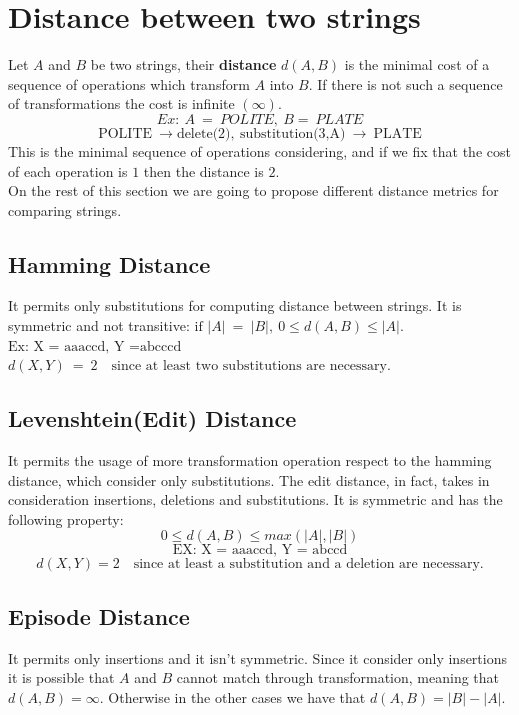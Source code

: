\section{Distance between two strings}
Let $A$ and $B$ be two strings, their \textbf{distance} $d(A,B)$ is the minimal cost of a sequence of operations which transform $A$ into $B$. If there is not such a sequence of transformations the cost is infinite $(\infty)$.
$$Ex:~A~=~POLITE,~B=~PLATE$$
$$\text{POLITE}~\rightarrow \text{delete(2)},~ \text{substitution(3,A)}~\rightarrow~\text{PLATE}$$
This is the minimal sequence of operations considering, and if we fix that the cost of each operation is $1$ then the distance is $2$.\\
On the rest of this section we are going to propose different distance metrics for comparing strings.

\subsection{Hamming Distance}
It permits only substitutions for computing distance between strings. It is symmetric and not transitive: $\text{if }|A|~=~|B|,~ 0\leq d(A,B) \leq |A|$.\\

$\text{Ex: X = aaaccd, Y =abcccd}$\\
$d(X,Y)~=~2 \quad \text{since at least two substitutions are necessary.}$

\subsection{Levenshtein(Edit) Distance}
It permits the usage of more transformation operation respect to the hamming distance, which consider only substitutions. The edit distance, in fact, takes in consideration insertions, deletions and substitutions. It is symmetric and has the following property:
$$0 \leq d(A,B) \leq max(|A|,|B|)$$
$$\text{EX: X = aaaccd, Y = abccd}$$
$$d(X,Y) = 2 \quad \text{since at least a substitution and a deletion are necessary.}$$

\subsection{Episode Distance}
It permits only insertions and it isn't symmetric. Since it consider only insertions it is possible that $A$ and $B$ cannot match through transformation, meaning that $d(A,B)= \infty$. Otherwise in the other cases we have that $d(A,B)=|B|-|A|$.

